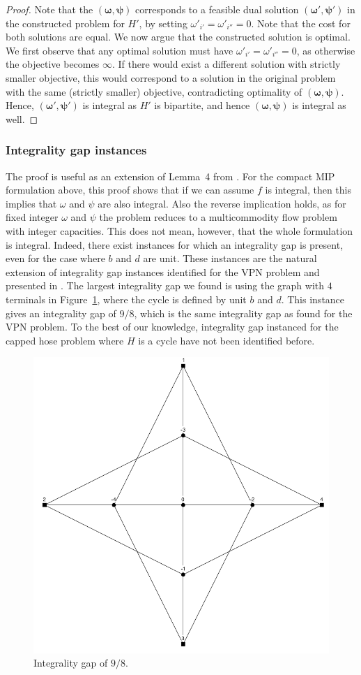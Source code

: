 \begin{proof}
    Note that the $(\boldsymbol \omega, \boldsymbol \psi)$ corresponds to a feasible dual solution $(\boldsymbol \omega', \boldsymbol \psi')$ in the constructed problem for $H'$, by setting $\omega'_{i'} = \omega'_{i''} = 0$.
    Note that the cost for both solutions are equal.
    We now argue that the constructed solution is optimal.
    We first observe that any optimal solution must have $\omega'_{i'} = \omega'_{i''} = 0$, as otherwise the objective becomes $\infty$.
    If there would exist a different solution with strictly smaller objective, this would correspond to a solution in the original problem with the same (strictly smaller) objective, contradicting optimality of $(\boldsymbol \omega, \boldsymbol \psi)$.
    Hence, $(\boldsymbol \omega', \boldsymbol \psi')$ is integral as $H'$ is bipartite, and hence $(\boldsymbol \omega, \boldsymbol \psi)$ is integral as well.
\end{proof}

\subsubsection{Integrality gap instances}
The proof is useful as an extension of Lemma~4 from \cite{bosman2017exploring}.
For the compact MIP formulation above, this proof shows that if we can assume $f$ is integral, then this implies that $\omega$ and $\psi$ are also integral.
Also the reverse implication holds, as for fixed integer $\omega$ and $\psi$ the problem reduces to a multicommodity flow problem with integer capacities.
This does not mean, however, that the whole formulation is integral.
Indeed, there exist instances for which an integrality gap is present, even for the case where $b$ and $d$ are unit.
These instances are the natural extension of integrality gap instances identified for the VPN problem and presented in \cite{goyal2013vpn}.
The largest integrality gap we found is using the graph with $4$ terminals in Figure~\ref{fig:gap4}, where the cycle is defined by unit $b$ and $d$.
This instance gives an integrality gap of $9/8$, which is the same integrality gap as found for the VPN problem.
To the best of our knowledge, integrality gap instanced for the capped hose problem where $H$ is a cycle have not been identified before.

\begin{figure}
    \centering
    \includegraphics[width=.45\textwidth]{gap4}
    \caption{Integrality gap of $9/8$.} \label{fig:gap4}
\end{figure}

